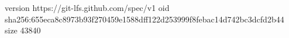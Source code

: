 version https://git-lfs.github.com/spec/v1
oid sha256:655eca8c8973b93f270459e1588dff122d253999f8febac14d742bc3dcfd2b44
size 43840
